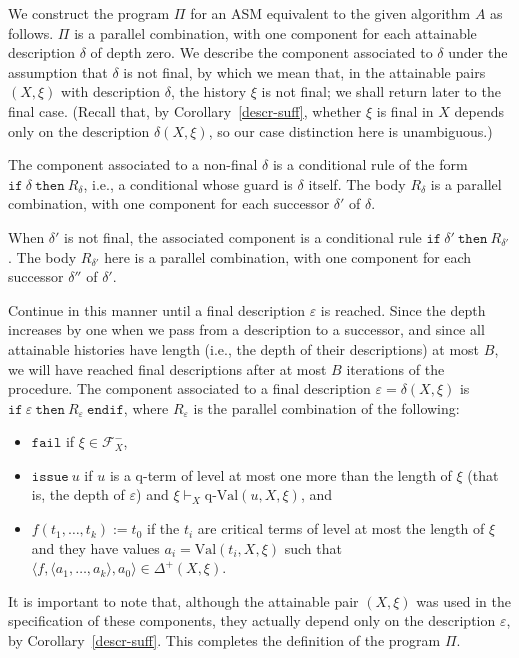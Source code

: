 \documentclass{LMCS}
\theoremstyle{definition}
\newenvironment{ls}{\begin{itemize}}{\end{itemize}}
\newcommand{\DD}{\Delta^+}
\newcommand{\eps}{\varepsilon}
\newcommand{\qval}[3]{\ensuremath{\text{q-Val}(#1,#2,#3)}}
\newcommand{\scr}[1]{\ensuremath{\mathcal {#1}}}
\newcommand{\sq}[1]{\ensuremath{\langle#1\rangle}}
\newcommand{\ttt}[1]{\ensuremath{\mathtt {#1}}}
\newcommand{\val}[3]{\ensuremath{\text{Val}(#1,#2,#3)}}
\begin{document}
We construct the program $\Pi$ for an ASM equivalent to the given
algorithm $A$ as follows.  $\Pi$ is a parallel combination, with one
component for each attainable description $\delta$ of depth zero. We
describe the component associated to $\delta$ under the assumption
that $\delta$ is not final, by which we mean that, in the attainable
pairs $(X,\xi)$ with description $\delta$, the history $\xi$ is not
final; we shall return later to the final case.  (Recall
that, by Corollary~\ref{descr-suff}, whether $\xi$ is final in $X$
depends only on the description $\delta(X,\xi)$, so our case
distinction here is unambiguous.)

The component associated to a non-final $\delta$ is a conditional rule
of the form $\ttt{if\ }\delta\ttt{\ then\ }R_\delta$, i.e., a
conditional whose guard is $\delta$ itself.  The body $R_\delta$ is a
parallel combination, with one component for each successor $\delta'$
of $\delta$.

When $\delta'$ is not final, the associated component is
a conditional rule $\ttt{if\ }\delta'\ttt{\ then\ }R_{\delta'}$.  The
body $R_{\delta'}$ here is a parallel combination, with one component
for each successor $\delta''$ of $\delta'$.

Continue in this manner until a final description $\eps$ is reached.
Since the depth increases by one when we pass from a description to a
successor, and since all attainable histories have length (i.e., the
depth of their descriptions) at most $B$, we will have reached final
descriptions after at most $B$ iterations of the procedure.  The
component associated to a final description $\eps=\delta(X,\xi)$ is
$\ttt{if\ }\eps\ttt{\ then\ }R_\eps\ttt{\ endif}$, where $R_\eps$ is
the parallel combination of the following:
\begin{ls}
\item \ttt{fail} if $\xi\in\scr F_X^-$,
\item $\ttt{issue}\ u$ if $u$ is a q-term of level at most one more
than the length of $\xi$ (that is, the depth of $\eps$) and
$\xi\vdash_X\qval uX\xi$, and
\item $f(t_1,\dots,t_k):=t_0$ if the $t_i$ are critical terms of
level at most
  the length of $\xi$ and they have values $a_i=\val{t_i}X\xi$ such
  that $\sq{f,\sq{a_1,\dots,a_k},a_0}\in\DD(X,\xi)$.
\end{ls}
It is important to note that, although the attainable pair
$(X,\xi)$ was used in the specification of these components, they
actually depend only on the description $\eps$, by
Corollary~\ref{descr-suff}. This completes the definition of the
program $\Pi$.
\end{document}
